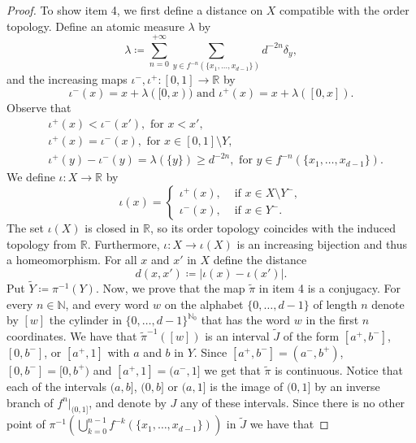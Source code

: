 \documentclass[10pt,a4paper]{amsart}
\numberwithin{equation}{section} %
\numberwithin{figure}{section} %
\newcommand{\N}{\mathbb{N}}
\newcommand{\R}{\mathbb{R}}
\renewcommand{\=}{\coloneqq}
\begin{document}
\begin{proof}
    To show item 4, we first define a distance on $X$ compatible with the order topology. Define an atomic measure $\lambda$ by 
    \begin{equation}
        \lambda \= \sum_{n=0}^{+\infty} \sum_{y\in f^{-n}(\{x_1,\ldots,x_{d-1}\})} d^{-2n}\delta_y,
    \end{equation}
    and the increasing maps $\iota^-,\iota^+: [0,1]\to\R$ by
    \begin{equation}
        \iota^-(x)= x + \lambda([0,x)) \text{ and } \iota^+(x)= x + \lambda([0,x]).
    \end{equation}
    Observe that 
    \begin{equation*}
        \begin{split}
        &\iota^+(x) < \iota^-(x'), \text{ for } x<x',\\
        & \iota^+(x) = \iota^-(x), \text{ for } x\in[0,1]\setminus Y,\\
        & \iota^+(y) - \iota^{-}(y) = \lambda(\{y\}) \geq d^{-2n}, \text{ for } y\in f^{-n}(\{x_1,\ldots,x_{d-1}\}).
        \end{split}
    \end{equation*}
    We define $\iota:X\to\R$ by 
    \begin{equation}
        \iota(x) = \begin{cases}
            \iota^+(x), & \text{ if }x\in X\setminus Y^{-},\\
            \iota^-(x), & \text{ if }x\in Y^-.
        \end{cases}
    \end{equation}
    The set $\iota(X)$ is closed in $\R$, so its order topology coincides with the induced topology from $\R$. Furthermore, $\iota: X\to\iota(X)$ is an increasing bijection and thus a homeomorphism. For all $x$ and $x'$ in $X$ define the distance 
    \begin{equation}
        d(x,x')\=|\iota(x) - \iota(x')|. 
    \end{equation}
    Put $\widetilde{Y}\= \pi^{-1}(Y)$. Now, we prove that the map $\widetilde{\pi}$ in item 4 is a conjugacy. For every $n\in\N$, and every word $w$ on the alphabet $\{0,\ldots,d-1\}$ of length $n$ denote by $[w]$ the cylinder in $\{0,\ldots,d-1\}^{\N_0}$ that has the word $w$ in the first $n$ coordinates. We have that $\widetilde{\pi}^{-1}([w])$ is an interval $\widetilde{J}$ of the form $[a^+,b^-]$, $[0,b^-]$, or $[a^+,1]$ with $a$ and $b$ in $Y$. Since $[a^+,b^-] = (a^-,b^+)$, $[0,b^-]=[0,b^+)$ and $[a^+,1] = (a^-,1]$ we get that $\widetilde{\pi}$ is continuous. Notice that each of the intervals $(a,b]$, $(0,b]$ or $(a,1]$ is the image of $(0,1]$ by an inverse branch of $f^n|_{(0,1]}$, and denote by $J$ any of these intervals. Since there is no other point of $\pi^{-1}\left( \bigcup_{k=0}^{n-1} f^{-k}(\{x_1,\ldots,x_{d-1}\})\right)$ in $\widetilde{J}$ we have that

\end{proof}
\end{document}
